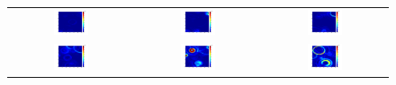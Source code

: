 \begin{figure}[H]
\begin{tabular}{ccc}
	\includegraphics[width=0.3\textwidth]{linea_timerev/figuras/timereversal/ev3/tr324.png}&
	\includegraphics[width=0.3\textwidth]{linea_timerev/figuras/timereversal/ev3/tr325.png}&
	\includegraphics[width=0.3\textwidth]{linea_timerev/figuras/timereversal/ev3/tr326.png}\\
	\includegraphics[width=0.3\textwidth]{linea_timerev/figuras/timereversal/ev3/tr327.png}&
	\includegraphics[width=0.3\textwidth]{linea_timerev/figuras/timereversal/ev3/tr328.png}&
	\includegraphics[width=0.3\textwidth]{linea_timerev/figuras/timereversal/ev3/tr329.png}\\

\end{tabular}
\end{figure}

